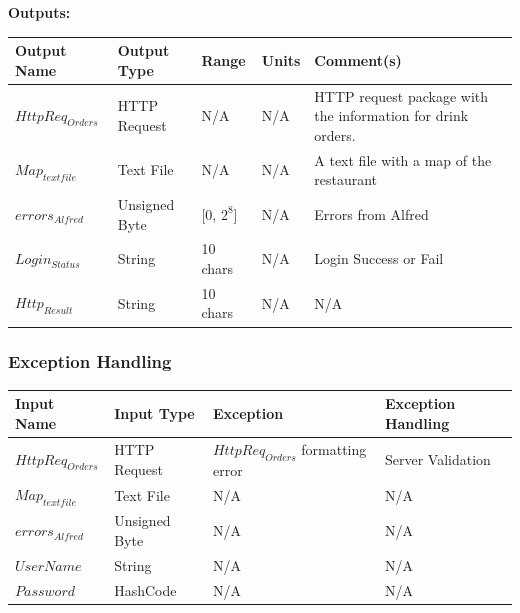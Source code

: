 \documentclass [10pt]{article}
\begin{document}
\textbf{Outputs: } \\

\begin{longtable}{| p{} | p{} | p{} | p{} | p{} |}\hline 
	\rowcolor{tableCell}\textbf{Output Name} & \textbf{Output Type} & \textbf{Range} & \textbf{Units} & \textbf{Comment(s)} \\ \hline
	$ HttpReq_{Orders} $ & HTTP Request & N/A & N/A & HTTP request package with the information for drink orders. \\ \hline
	\rowcolor{tableCell}$ Map_{textfile} $ & Text File & N/A & N/A & A text file with a map of the restaurant \\ \hline
	$  errors_{Alfred} $ & Unsigned Byte & [0, $2^{8}$]& N/A & Errors from Alfred \\ \hline
	\rowcolor{tableCell}$  Login_{Status} $ & String & 10 chars & N/A & Login Success or Fail \\ \hline
	$  Http_{Result} $ & String & 10 chars & N/A & N/A\\ \hline
\end{longtable}


\subsubsection{Exception Handling}

\begin{longtable}{| l | l | l | l |}\hline 
	\rowcolor{tableCell}\textbf{Input Name} & \textbf{Input Type} & \textbf{Exception} & \textbf{Exception Handling} \\ \hline
	$ HttpReq_{Orders} $ & HTTP Request & $ HttpReq_{Orders} $ formatting error & Server Validation \\ \hline
	\rowcolor{tableCell}$ Map_{textfile} $ & Text File & N/A & N/A \\ \hline
	$  errors_{Alfred} $ & Unsigned Byte & N/A & N/A \\ \hline
	\rowcolor{tableCell}$  UserName $ & String & N/A & N/A\\ \hline
	$  Password $ & HashCode & N/A & N/A \\ \hline
\end{longtable}


\end{document}
